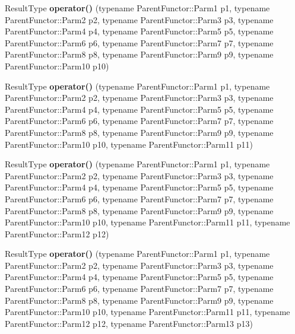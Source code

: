 \begin{DoxyCompactItemize}
\item 
\hypertarget{classutilspp_1_1MemFunHandler_a5385ff18543e2aea3cd7f9aeb1dbbfcf}{Result\-Type {\bfseries operator()} (typename Parent\-Functor\-::\-Parm1 p1, typename Parent\-Functor\-::\-Parm2 p2, typename Parent\-Functor\-::\-Parm3 p3, typename Parent\-Functor\-::\-Parm4 p4, typename Parent\-Functor\-::\-Parm5 p5, typename Parent\-Functor\-::\-Parm6 p6, typename Parent\-Functor\-::\-Parm7 p7, typename Parent\-Functor\-::\-Parm8 p8, typename Parent\-Functor\-::\-Parm9 p9, typename Parent\-Functor\-::\-Parm10 p10)}\label{classutilspp_1_1MemFunHandler_a5385ff18543e2aea3cd7f9aeb1dbbfcf}

\item 
\hypertarget{classutilspp_1_1MemFunHandler_af549caf22c277a8675a111fb9dae04ab}{Result\-Type {\bfseries operator()} (typename Parent\-Functor\-::\-Parm1 p1, typename Parent\-Functor\-::\-Parm2 p2, typename Parent\-Functor\-::\-Parm3 p3, typename Parent\-Functor\-::\-Parm4 p4, typename Parent\-Functor\-::\-Parm5 p5, typename Parent\-Functor\-::\-Parm6 p6, typename Parent\-Functor\-::\-Parm7 p7, typename Parent\-Functor\-::\-Parm8 p8, typename Parent\-Functor\-::\-Parm9 p9, typename Parent\-Functor\-::\-Parm10 p10, typename Parent\-Functor\-::\-Parm11 p11)}\label{classutilspp_1_1MemFunHandler_af549caf22c277a8675a111fb9dae04ab}

\item 
\hypertarget{classutilspp_1_1MemFunHandler_a6a2090b84b93f73351757af81a8d9a11}{Result\-Type {\bfseries operator()} (typename Parent\-Functor\-::\-Parm1 p1, typename Parent\-Functor\-::\-Parm2 p2, typename Parent\-Functor\-::\-Parm3 p3, typename Parent\-Functor\-::\-Parm4 p4, typename Parent\-Functor\-::\-Parm5 p5, typename Parent\-Functor\-::\-Parm6 p6, typename Parent\-Functor\-::\-Parm7 p7, typename Parent\-Functor\-::\-Parm8 p8, typename Parent\-Functor\-::\-Parm9 p9, typename Parent\-Functor\-::\-Parm10 p10, typename Parent\-Functor\-::\-Parm11 p11, typename Parent\-Functor\-::\-Parm12 p12)}\label{classutilspp_1_1MemFunHandler_a6a2090b84b93f73351757af81a8d9a11}

\item 
\hypertarget{classutilspp_1_1MemFunHandler_a7e9b2ee3bcb5b04d06888712adea2023}{Result\-Type {\bfseries operator()} (typename Parent\-Functor\-::\-Parm1 p1, typename Parent\-Functor\-::\-Parm2 p2, typename Parent\-Functor\-::\-Parm3 p3, typename Parent\-Functor\-::\-Parm4 p4, typename Parent\-Functor\-::\-Parm5 p5, typename Parent\-Functor\-::\-Parm6 p6, typename Parent\-Functor\-::\-Parm7 p7, typename Parent\-Functor\-::\-Parm8 p8, typename Parent\-Functor\-::\-Parm9 p9, typename Parent\-Functor\-::\-Parm10 p10, typename Parent\-Functor\-::\-Parm11 p11, typename Parent\-Functor\-::\-Parm12 p12, typename Parent\-Functor\-::\-Parm13 p13)}\label{classutilspp_1_1MemFunHandler_a7e9b2ee3bcb5b04d06888712adea2023}


\end{DoxyCompactItemize}
